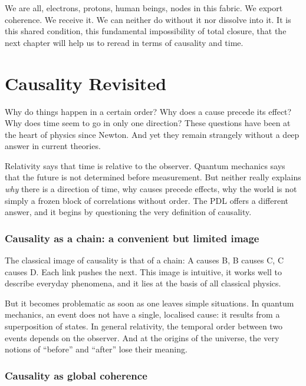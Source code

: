\documentclass[11pt, a4paper, openright]{book}
\begin{document}
\medskip

We are all, electrons, protons, human beings, nodes in this fabric. We export coherence. We receive it. We can neither do without it nor dissolve into it. It is this shared condition, this fundamental impossibility of total closure, that the next chapter will help us to reread in terms of causality and time.

\chapter{Causality Revisited}

Why do things happen in a certain order? Why does a cause precede its effect? Why does time seem to go in only one direction? These questions have been at the heart of physics since Newton. And yet they remain strangely without a deep answer in current theories.

\medskip

Relativity says that time is relative to the observer. Quantum mechanics says that the future is not determined before measurement. But neither really explains \emph{why} there is a direction of time, why causes precede effects, why the world is not simply a frozen block of correlations without order. The PDL offers a different answer, and it begins by questioning the very definition of causality.

\subsection*{Causality as a chain: a convenient but limited image}

The classical image of causality is that of a chain: A causes B, B causes C, C causes D. Each link pushes the next. This image is intuitive, it works well to describe everyday phenomena, and it lies at the basis of all classical physics.

\medskip

But it becomes problematic as soon as one leaves simple situations. In quantum mechanics, an event does not have a single, localised cause: it results from a superposition of states. In general relativity, the temporal order between two events depends on the observer. And at the origins of the universe, the very notions of “before” and “after” lose their meaning.

\subsection*{Causality as global coherence}
\end{document}
